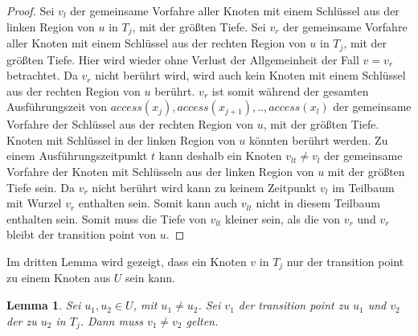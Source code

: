 \documentclass[a4paper,12pt]{article}
\newtheorem{Lemma}{Lemma}[section]
\begin{document}
\begin{proof}
	Sei $v_l$ der gemeinsame Vorfahre aller Knoten mit einem Schlüssel aus der linken Region von $u$ in $T_j$, mit der größten Tiefe. Sei $v_r$ der gemeinsame Vorfahre aller Knoten mit einem Schlüssel aus der rechten Region von $u$ in $T_j$, mit der größten Tiefe. Hier wird wieder ohne Verlust der Allgemeinheit der Fall $v = v_r$ betrachtet. Da $v_r$ nicht berührt wird, wird auch kein Knoten mit einem Schlüssel aus der rechten Region von $u$ berührt. $v_r$ ist somit während der gesamten Ausführungszeit von $\textit{access}\left(x_j\right),\textit{access}\left(x_{j+1}\right),..,\textit{access}\left(x_l\right)$  der gemeinsame Vorfahre der Schlüssel aus der rechten Region von $u$, mit der größten Tiefe. Knoten mit Schlüssel in der linken Region von $u$ könnten berührt werden. Zu einem Ausführungszeitpunkt $t$ kann deshalb ein Knoten $v_{lt} \ne v_l$ der gemeinsame Vorfahre der Knoten mit Schlüsseln aus der linken Region von $u$ mit der größten Tiefe sein. Da $v_r$ nicht berührt wird kann zu keinem Zeitpunkt $v_l$ im Teilbaum mit Wurzel $v_r$ enthalten sein. Somit kann auch $v_{lt}$ nicht in diesem Teilbaum enthalten sein. Somit muss die Tiefe von  $v_{lt}$ kleiner sein, als die von $v_r$ und $v_r$ bleibt der transition point von $u$. 
\end{proof}

\noindent Im dritten Lemma wird gezeigt, dass ein Knoten $v$ in $T_j$ nur der transition point zu einem Knoten aus $U$ sein kann.


\begin{Lemma}\label{lemmaDemaine3}
	Sei $u_1, u_2 \in U$, mit $u_1 \ne u_2$.  Sei $v_1$ der transition point zu $u_1$ und $v_2$ der zu $u_2$ in $T_j$. Dann muss $v_1 \neq v_2$ gelten.
\end{Lemma}
\end{document}
